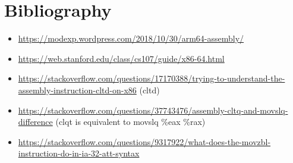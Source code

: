 \documentclass[11pt]{article}
\begin{document}
\section{Bibliography}
\label{sec:orgac21260}
\begin{itemize}
\item \url{https://modexp.wordpress.com/2018/10/30/arm64-assembly/}
\item \url{https://web.stanford.edu/class/cs107/guide/x86-64.html}
\item \url{https://stackoverflow.com/questions/17170388/trying-to-understand-the-assembly-instruction-cltd-on-x86} (cltd)
\item \url{https://stackoverflow.com/questions/37743476/assembly-cltq-and-movslq-difference} (clqt is equivalent to movslq \%eax \%rax)
\item \url{https://stackoverflow.com/questions/9317922/what-does-the-movzbl-instruction-do-in-ia-32-att-syntax}
\end{itemize}
\end{document}
